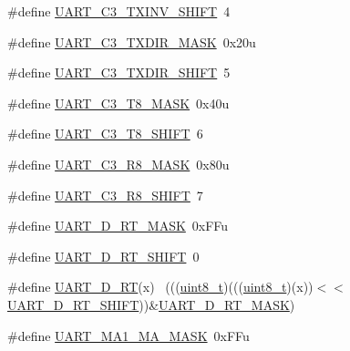 \begin{DoxyCompactItemize}
\#define \hyperlink{group___u_a_r_t___register___masks_ga99b840aeb5c25012354a1cd40ec35de7}{U\+A\+R\+T\+\_\+\+C3\+\_\+\+T\+X\+I\+N\+V\+\_\+\+S\+H\+I\+FT}~4
\item 
\#define \hyperlink{group___u_a_r_t___register___masks_gae9909f5ed584e6647deec86775f025e7}{U\+A\+R\+T\+\_\+\+C3\+\_\+\+T\+X\+D\+I\+R\+\_\+\+M\+A\+SK}~0x20u
\item 
\#define \hyperlink{group___u_a_r_t___register___masks_gafd8df440afc872879f09780112122e6a}{U\+A\+R\+T\+\_\+\+C3\+\_\+\+T\+X\+D\+I\+R\+\_\+\+S\+H\+I\+FT}~5
\item 
\#define \hyperlink{group___u_a_r_t___register___masks_gaec915ed2882cf21feb385399e44b5a9b}{U\+A\+R\+T\+\_\+\+C3\+\_\+\+T8\+\_\+\+M\+A\+SK}~0x40u
\item 
\#define \hyperlink{group___u_a_r_t___register___masks_ga98e310521d3edf56770be85701a65142}{U\+A\+R\+T\+\_\+\+C3\+\_\+\+T8\+\_\+\+S\+H\+I\+FT}~6
\item 
\#define \hyperlink{group___u_a_r_t___register___masks_gae17bda6e18ad786d2cedf0105976d9dc}{U\+A\+R\+T\+\_\+\+C3\+\_\+\+R8\+\_\+\+M\+A\+SK}~0x80u
\item 
\#define \hyperlink{group___u_a_r_t___register___masks_gab1799b4eb595a66cc5995e206e001f78}{U\+A\+R\+T\+\_\+\+C3\+\_\+\+R8\+\_\+\+S\+H\+I\+FT}~7
\item 
\#define \hyperlink{group___u_a_r_t___register___masks_gabb8507803e62ff2f8cc3a3c7f9fc43c2}{U\+A\+R\+T\+\_\+\+D\+\_\+\+R\+T\+\_\+\+M\+A\+SK}~0x\+F\+Fu
\item 
\#define \hyperlink{group___u_a_r_t___register___masks_ga045cb82177942d68eb711a61ee412768}{U\+A\+R\+T\+\_\+\+D\+\_\+\+R\+T\+\_\+\+S\+H\+I\+FT}~0
\item 
\#define \hyperlink{group___u_a_r_t___register___masks_ga4f5ba4e9a327cd6730693568463e8d67}{U\+A\+R\+T\+\_\+\+D\+\_\+\+RT}(x)                                                      ~(((\hyperlink{_p_e___types_8h_aba7bc1797add20fe3efdf37ced1182c5}{uint8\+\_\+t})(((\hyperlink{_p_e___types_8h_aba7bc1797add20fe3efdf37ced1182c5}{uint8\+\_\+t})(x))$<$$<$\hyperlink{group___u_a_r_t___register___masks_ga045cb82177942d68eb711a61ee412768}{U\+A\+R\+T\+\_\+\+D\+\_\+\+R\+T\+\_\+\+S\+H\+I\+FT}))\&\hyperlink{group___u_a_r_t___register___masks_gabb8507803e62ff2f8cc3a3c7f9fc43c2}{U\+A\+R\+T\+\_\+\+D\+\_\+\+R\+T\+\_\+\+M\+A\+SK})
\item 
\#define \hyperlink{group___u_a_r_t___register___masks_gaa4fe1e60d0ca635fd633af77c3b63998}{U\+A\+R\+T\+\_\+\+M\+A1\+\_\+\+M\+A\+\_\+\+M\+A\+SK}~0x\+F\+Fu
\item 
$$
\end{DoxyCompactItemize}

